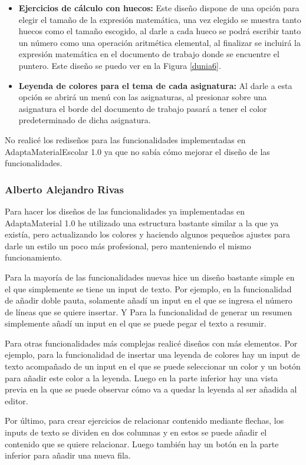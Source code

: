 \begin{itemize}
  \item  \textbf{Ejercicios de cálculo con huecos:} Este diseño dispone de una opción para elegir el tamaño de la expresión matemática, una vez elegido se muestra tanto huecos como el tamaño escogido, al darle a cada hueco se podrá escribir tanto un número como una operación aritmética elemental, al finalizar se incluirá la expresión matemática en el documento de trabajo donde se encuentre el puntero. Este diseño se puedo ver en la Figura \ref{dunia6}.
  \item  \textbf{Leyenda de colores para el tema de cada asignatura:} Al darle a esta opción se abrirá un menú con las asignaturas, al presionar sobre una asignatura el borde del documento de trabajo pasará a tener el color predeterminado de dicha asignatura.
\end{itemize}
No realicé los rediseños para las funcionalidades implementadas en AdaptaMaterialEscolar 1.0  ya que no sabía cómo mejorar el diseño de las funcionalidades. 

\subsubsection{Alberto Alejandro Rivas}
Para hacer los diseños de las funcionalidades ya implementadas en AdaptaMaterial 1.0 he utilizado una estructura bastante similar a la que ya existía, pero actualizando los colores y haciendo algunos pequeños ajustes para darle un estilo un poco más profesional, pero manteniendo el mismo funcionamiento.
 
Para la mayoría de las funcionalidades nuevas hice un diseño bastante simple en el que simplemente se tiene un input de texto. Por ejemplo, en la funcionalidad de añadir doble pauta, solamente añadí un input en el que se ingresa el número de líneas que se quiere insertar. Y Para la funcionalidad de generar un resumen simplemente añadí un input en el que se puede pegar el texto a resumir. 
 
Para otras funcionalidades más complejas realicé diseños con más elementos. Por ejemplo, para la funcionalidad de insertar una leyenda de colores hay un input de texto acompañado de un input en el que se puede seleccionar un color y un botón para añadir este color a la leyenda. Luego en la parte inferior hay una vista previa en la que se puede observar cómo va a quedar la leyenda al ser añadida al editor.
 
Por último, para crear ejercicios de relacionar contenido mediante flechas, los inputs de texto se dividen en dos columnas y en estos se puede añadir el contenido que se quiere relacionar. Luego también hay un botón en la parte inferior para añadir una nueva fila.
 

